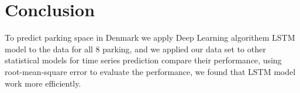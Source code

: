 \documentclass[10pt, conference, compsocconf]{IEEEtran}
\begin{document}
\section{Conclusion}
To predict parking space in Denmark we apply Deep Learning algorithem LSTM model to the data for all 8 parking, and we applied our data set to other statistical models for time series prediction compare their performance, using root-mean-square error to evaluate the performance, we found that LSTM model work more efficiently.
\end{document}
